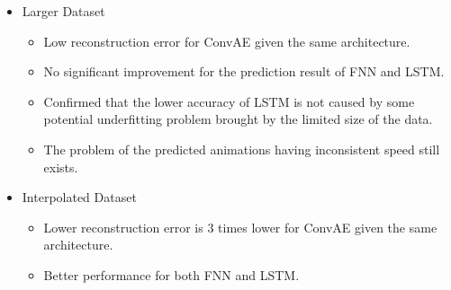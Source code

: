 {\begin{itemize}
\begin{itemize}
            \begin{itemize}
                \item output-as-input prediction fails to capture the trend of simulation in its worst case and the prediction result is completely different to the actual simulations.
            
                \item while the second method mostly matches with the actual output even in its worst case.
            
            \end{itemize}

            \item LSTM has a higher loss value than FNN, but is able to capture the characteristic of the simulation more precisely.

            \item predicted animations generated by FNN and LSTM are either moving faster or slower than the actual simulations.
            
        \end{itemize}
        
    \item Larger Dataset
        \begin{itemize}
            \item Low reconstruction error for ConvAE given the same architecture.

            \item No significant improvement for the prediction result of FNN and LSTM.

            \item Confirmed that the lower accuracy of LSTM is not caused by some potential underfitting problem brought by the limited size of the data.
            
            \item The problem of the predicted animations having inconsistent speed still exists.
            
        \end{itemize}

        
    \item Interpolated Dataset
    
    \begin{itemize}
            \item Lower reconstruction error is 3 times lower for ConvAE given the same architecture.

            \item Better performance for both FNN and LSTM.
            

\end{itemize}
\end{itemize}}
